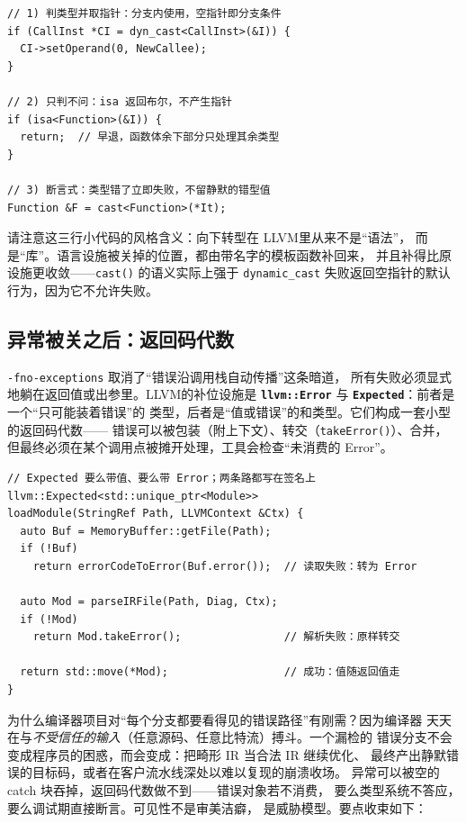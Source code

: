 \documentclass[12pt,a4paper,fontset=fandol]{ctexbook}
\newcommand{\Fn}[1]{\texttt{#1()}}
\newcommand{\Tp}[1]{\texttt{#1}}
\newcommand{\Bk}{\discretionary{}{}{}}
\newcommand{\Lib}[1]{\textbf{\texttt{#1}}}
\newcommand{\Lang}[1]{\textsf{#1}}
\newcommand{\DomLlvm}{\Lang{LLVM}}
\begin{document}
\begin{lstlisting}[style=cppstyle,caption={三段式向下转型：模板对 dynamic\_cast 的替代},label={lst:ch03-downcast}]
// 1) 判类型并取指针：分支内使用，空指针即分支条件
if (CallInst *CI = dyn_cast<CallInst>(&I)) {
  CI->setOperand(0, NewCallee);
}

// 2) 只判不问：isa 返回布尔，不产生指针
if (isa<Function>(&I)) {
  return;  // 早退，函数体余下部分只处理其余类型
}

// 3) 断言式：类型错了立即失败，不留静默的错型值
Function &F = cast<Function>(*It);
\end{lstlisting}

请注意这三行小代码的风格含义：向下转型在 \DomLlvm 里从来不是``语法''，
而是``库''。语言设施被关掉的位置，都由带名字的模板函数补回来，
并且补得比原设施更收敛——\Fn{cast} 的语义实际上强于
\Tp{dynamic\_{\Bk}cast} 失败返回空指针的默认行为，因为它不允许失败。

\subsection*{异常被关之后：返回码代数}

\Tp{-fno-exceptions} 取消了``错误沿调用栈自动传播''这条暗道，
所有失败必须显式地躺在返回值或出参里。\DomLlvm 的补位设施是
\Lib{llvm::Error} 与 \Lib{Expected}：前者是一个``只可能装着错误''的
类型，后者是``值或错误''的和类型。它们构成一套小型的返回码代数——
错误可以被包装（附上下文）、转交（\Fn{takeError}）、合并，
但最终必须在某个调用点被摊开处理，工具会检查``未消费的 Error''。

\begin{lstlisting}[style=cppstyle,caption={\Lib{Expected} 风格的两段式失败路径},label={lst:ch03-expected}]
// Expected 要么带值、要么带 Error；两条路都写在签名上
llvm::Expected<std::unique_ptr<Module>>
loadModule(StringRef Path, LLVMContext &Ctx) {
  auto Buf = MemoryBuffer::getFile(Path);
  if (!Buf)
    return errorCodeToError(Buf.error());  // 读取失败：转为 Error

  auto Mod = parseIRFile(Path, Diag, Ctx);
  if (!Mod)
    return Mod.takeError();                // 解析失败：原样转交

  return std::move(*Mod);                  // 成功：值随返回值走
}
\end{lstlisting}

为什么编译器项目对``每个分支都要看得见的错误路径''有刚需？因为编译器
天天在与\emph{不受信任的输入}（任意源码、任意比特流）搏斗。一个漏检的
错误分支不会变成程序员的困惑，而会变成：把畸形 IR 当合法 IR 继续优化、
最终产出静默错误的目标码，或者在客户流水线深处以难以复现的崩溃收场。
异常可以被空的 catch 块吞掉，返回码代数做不到——错误对象若不消费，
要么类型系统不答应，要么调试期直接断言。可见性不是审美洁癖，
是威胁模型。要点收束如下：
\end{document}
